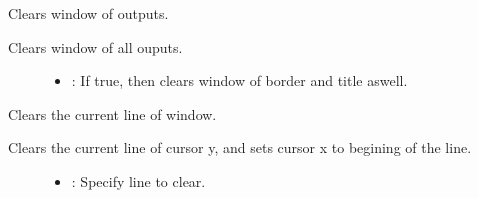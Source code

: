 \documentclass[letterpaper,10pt,english]{sphinxmanual}
\begin{document}
\begin{fulllineitems}
\begin{fulllineitems}
\begin{description}
\begin{itemize}
\end{itemize}

\end{description}


\end{fulllineitems}


\begin{fulllineitems}
\label{\detokenize{index:_CPPv2N7ostendo6Window5ClearEb}}%
\pysigstartmultiline
{}\label{\detokenize{index:Pessumclassostendo_1_1Window_1ae4c005e63e6b15c5e9b940025a80b90d}}%
\pysigstopmultiline
Clears window of outputs. 

Clears window of all ouputs. \begin{description}
\item[{}] \leavevmode\begin{itemize}
\item {} 
: If true, then clears window of border and title aswell. 

\end{itemize}

\end{description}


\end{fulllineitems}


\begin{fulllineitems}
\label{\detokenize{index:_CPPv2N7ostendo6Window9ClearLineEi}}%
\pysigstartmultiline
{}\label{\detokenize{index:Pessumclassostendo_1_1Window_1abaa3685e5937a29aabd7acf078b789c1}}%
\pysigstopmultiline
Clears the current line of window. 

Clears the current line of cursor y, and sets cursor x to begining of the line. \begin{description}
\item[{}] \leavevmode\begin{itemize}
\item {} 
: Specify line to clear. 

\end{itemize}

\end{description}



\end{fulllineitems}
\end{fulllineitems}
\end{document}
